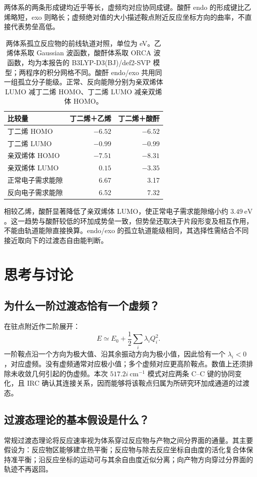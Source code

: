 \documentclass[a4paper,12pt]{article}
\begin{document}
两体系的两条形成键均近乎等长，虚频均对应协同成键。酸酐 endo 的形成键比乙烯略短，exo 则略长；虚频绝对值的大小描述鞍点附近反应坐标方向的曲率，不直接代表势垒高低。

\begin{table}[htbp]
\centering\small
\caption{两体系孤立反应物的前线轨道对照，单位为 eV。乙烯体系取 Gaussian 波函数，酸酐体系取 ORCA 波函数，均为本报告的 B3LYP-D3(BJ)/def2-SVP 模型；两程序的积分网格不同。酸酐 endo/exo 共用同一组孤立分子能级。正常、反向能隙分别为亲双烯体 LUMO 减丁二烯 HOMO、丁二烯 LUMO 减亲双烯体 HOMO。}
\label{tab:systems-orbitals}
\begin{tabular}{lrr}
\toprule
比较量 & 丁二烯＋乙烯 & 丁二烯＋酸酐\\
\midrule
丁二烯 HOMO & $-6.52$ & $-6.52$\\
丁二烯 LUMO & $-0.99$ & $-0.99$\\
亲双烯体 HOMO & $-7.51$ & $-8.31$\\
亲双烯体 LUMO & $0.15$ & $-3.35$\\
正常电子需求能隙 & 6.67 & 3.17\\
反向电子需求能隙 & 6.52 & 7.32\\
\bottomrule
\end{tabular}
\end{table}

相较乙烯，酸酐显著降低了亲双烯体 LUMO，使正常电子需求能隙缩小约 $3.49\ \mathrm{eV}$。这一趋势与酸酐较低的环加成势垒一致，但势垒还取决于片段形变及相互作用，不能由轨道能隙直接换算。endo/exo 的孤立轨道能级相同，其选择性需结合不同接近取向下的过渡态自由能判断。

\section{思考与讨论}
\subsection{为什么一阶过渡态恰有一个虚频？}
在驻点附近作二阶展开：
\begin{equation}
E\simeq E_0+\frac12\sum_i\lambda_i Q_i^2.
\end{equation}
一阶鞍点沿一个方向为极大值、沿其余振动方向为极小值，因此恰有一个 $\lambda_i<0$，对应虚频。没有虚频通常对应极小值；多个虚频对应更高阶鞍点。数值上还须排除未收敛几何引起的伪虚频。本次 $517.2i\ \mathrm{cm^{-1}}$ 模式对应两条 C--C 键的协同变化，且 IRC 确认其连接关系，因而能够将该鞍点归属为所研究环加成通道的过渡态\cite{transition-state}。

\subsection{过渡态理论的基本假设是什么？}
常规过渡态理论将反应速率视为体系穿过反应物与产物之间分界面的通量。其主要假设为：反应物区能够建立热平衡；反应物与除去反应坐标自由度的活化复合体保持准平衡；沿反应坐标的运动可与其余自由度近似分离；向产物方向穿过分界面的轨迹不再返回\cite{tst}。
\end{document}
